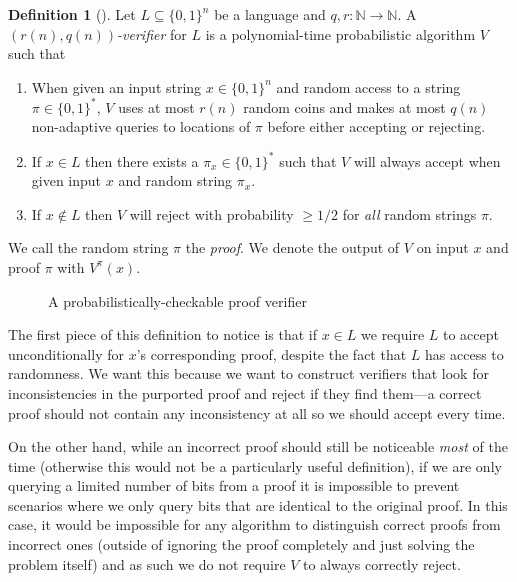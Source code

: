 \documentclass[english,12pt]{reedthesis}
\theoremstyle{plain}
\theoremstyle{definition}
\newtheorem{defn}[defn]{Definition}
\theoremstyle{remark}
\begin{document}
\begin{defn}[{\cite[Def.\ 18.1]{AB09}}]\label{def:prob-check}
  Let $L \subseteq \{0, 1\}^{n}$ be a language and $q, r\colon \mathbb{N} \rightarrow \mathbb{N}$. A
  \emph{$(r(n), q(n))$-verifier} for $L$ is a polynomial-time probabilistic
  algorithm $V$ such that
  \begin{enumerate}
    \item When given an input string $x \in \{0, 1\}^{n}$ and random access to a
          string $\pi \in \{0, 1\}^{*}$, $V$ uses at most $r(n)$ random coins and
          makes at most $q(n)$ non-adaptive queries to locations of $\pi$ before
          either accepting or rejecting.
    \item If $x \in L$ then there exists a $\pi_{x} \in \{0, 1\}^{*}$ such that $V$
          will always accept when given input $x$ and random string $\pi_{x}$.
    \item If $x \notin L$ then $V$ will reject with probability $\ge 1/2$ for
          \emph{all} random strings $\pi$.
  \end{enumerate}
  We call the random string $\pi$ the \emph{proof}. We denote the output of $V$ on
  input $x$ and proof $\pi$ with $V^{\pi}(x)$.
\end{defn}

\begin{figure}
  \centering
  \caption{A probabilistically-checkable proof verifier}\label{fig:pcp}
\end{figure}

The first piece of this definition to notice is that if $x \in L$ we require $L$
to accept unconditionally for $x$'s corresponding proof, despite the fact that
$L$ has access to randomness. We want this because we want to construct
verifiers that look for inconsistencies in the purported proof and reject if
they find them---a correct proof should not contain any inconsistency at all so we
should accept every time.

On the other hand, while an incorrect proof should still be noticeable
\emph{most} of the time (otherwise this would not be a particularly useful
definition), if we are only querying a limited number of bits from a proof it is
impossible to prevent scenarios where we only query bits that are identical to
the original proof. In this case, it would be impossible for any algorithm to
distinguish correct proofs from incorrect ones (outside of ignoring the proof
completely and just solving the problem itself) and as such we do not require
$V$ to always correctly reject.
\end{document}
